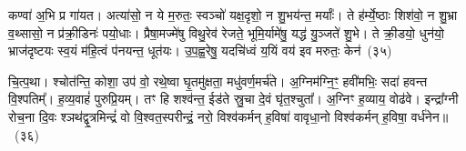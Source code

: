 कण्वा॑ अ॒भि प्र गा॑यत। अत्या॑सो॒ न ये म॒रुतः॒ स्वञ्चो॑ यक्ष॒दृशो॒ न शु॒भय॑न्त॒ मर्याः᳚। ते ह॑र्म्ये॒ष्ठाः शिश॑वो॒ न शु॒भ्रा व॒थ्सासो॒ न प्र॑क्री॒डिनः॑ पयो॒धाः। प्रैषा॒मज्मे॑षु विथु॒रेव॑ रेजते॒ भूमि॒र्यामे॑षु॒ यद्ध॑ यु॒ञ्जते॑ शु॒भे। ते क्री॒डयो॒ धुन॑यो॒ भ्राज॑दृष्टयः स्व॒यं म॑हि॒त्वं प॑नयन्त॒ धूत॑यः। उ॒प॒ह्व॒रेषु॒ यदचि॑ध्वं य॒यिं वय॑ इव मरुतः॒ केन॑~(३५)

चि॒त्प॒था। श्चोत॑न्ति॒ कोशा॒ उप॑ वो॒ रथे॒ष्वा घृ॒तमु॑क्षता॒ मधु॑वर्ण॒मर्च॑ते। अ॒ग्निम॑ग्नि॒ꣳ॒ हवी॑मभिः॒ सदा॑ हवन्त वि॒श्पतिम्᳚। ह॒व्य॒वाहं॑ पुरुप्रि॒यम्। तꣳ हि शश्व॑न्त॒ ईड॑ते स्रु॒चा दे॒वं घृ॑त॒श्चुता᳚। अ॒ग्निꣳ ह॒व्याय॒ वोढ॑वे। इन्द्रा᳚ग्नी रोच॒ना दि॒वः श्ञथ॑द्वृ॒त्रमिन्द्रं॑ वो वि॒श्वत॒स्परीन्द्रं॒ नरो॒ विश्व॑कर्मन् ह॒विषा॑ वावृधा॒नो विश्व॑कर्मन् ह॒विषा॒ वर्ध॑नेन॥~(३६)

{\anuvakamend[{सूर्य॑स्य॒ मनु॑षो मरुतः॒ पाव॑क॒ महो॑भी रथे॒शुभं॒ केन॒ षट्च॑त्वारिꣳशच्च}]}%


{\anuvakamend[{र॒श्मिर॑सि॒ राज्ञ्य॑स्य॒यं पु॒रो हरि॑केशो॒\-ऽग्निर्मू॒र्धेन्द्रा॒ग्निभ्यां॒ बृह॒स्पति॑र्भूय॒स्कृद॑स्य॒ग्निना॑ विश्वा॒षाट्प्र॒जा\-प॑ति॒र्मन॑सा॒ कृत्ति॑का॒ मधु॑श्च स॒मिद्दि॒शां द्वाद॑श}]}%
{}
